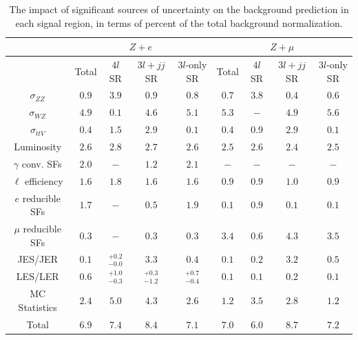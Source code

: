 \begin{table}[htbp]
  \renewcommand{\arraystretch}{1.5}
  \centering
  \begin{tabular}{|c|c|c|c|c||c|c|c|c|}
    \hline
     & \multicolumn{4}{c||}{$Z+e$} & \multicolumn{4}{c|}{$Z+\mu$} \\
    \hline
     &  Total & $4l$ SR & $3l+jj$ SR  & $3l$-only SR  & Total & $4l$ SR & $3l+jj$ SR  & $3l$-only SR  \\
    \hline
    $\sigma_{ZZ}$ & $0.9$  & $3.9$  & $0.9$  & $0.8$  & $0.7$  & $3.8$  & $0.4$  & $0.6$ \\
    $\sigma_{WZ}$ & $4.9$  & $0.1$  & $4.6$  & $5.1$  & $5.3$  & $-$  & $4.9$  & $5.6$  \\
    $\sigma_{ttV}$  & $0.4$  & $1.5$  & $2.9$  & $0.1$  & $0.4$  & $0.9$ & $2.9$  & $0.1$  \\
    Luminosity  & $2.6$ & $2.8$  & $2.7$  & $2.6$  & $2.5$  & $2.6$  & $2.4$  & $2.5$  \\
    $\gamma$ conv. SFs  & $2.0$  & $-$ & $1.2$  & $2.1$  & $-$ & $-$ & $-$ & $-$ \\
    $\ell$ efficiency & $1.6$  & $1.8$  & $1.6$  & $1.6$  & $0.9$  & $0.9$  & $1.0$  & $0.9$  \\
    $e$ reducible SFs  & $1.7$  & $-$ & $0.5$  & $1.9$ & $0.1$ & $0.9$  & $0.1$  & $0.1$  \\
    $\mu$ reducible SFs  &  $0.3$ & $-$ & $0.3$ & $0.3$ & $3.4$ & $0.6$ & $4.3$ & $3.5$  \\
    JES/JER & $0.1$  & $_{-0.0}^{+0.2}$  & $3.3$  & $0.4$  & $0.1$  & $0.2$  & $3.2$  & $0.5$  \\
    LES/LER & $0.6$ & $_{-0.3}^{+1.0}$  & $_{-1.2}^{+0.3}$  & $_{-0.4}^{+0.7}$  & $0.1$  & $0.1$  & $0.2$  & $0.1$  \\
    MC Statistics & $2.4$ & $5.0$ & $4.3$ & $2.6$ & $1.2$ & $3.5$ & $2.8$ & $1.2$ \\
    \hline
    \hline
    Total & $6.9$ & $7.4$ & $8.4$ & $7.1$ & $7.0$ & $6.0$ & $8.7$ & $7.2$ \\
    \hline
  \end{tabular}
  \caption{The impact of significant sources of uncertainty on the background prediction in each signal region, in terms of percent of the total background normalization.}
  \label{table:systematics-summary}
\end{table}

